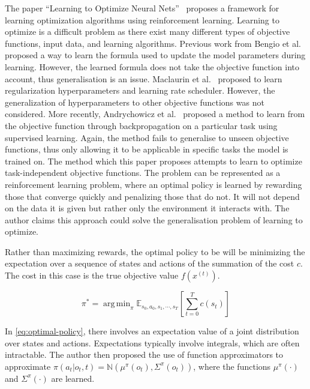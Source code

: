 \documentclass{article}
\DeclareMathOperator*{\argmin}{arg\,min}
\begin{document}
The paper ``Learning to Optimize Neural Nets''~\cite{liLearningOptimizeNeural2017} proposes a framework for learning optimization algorithms using reinforcement learning. Learning to optimize is a difficult problem as there exist many different types of objective functions, input data, and learning algorithms. Previous work from Bengio et al.~\cite{LearningSynapticLearning} proposed a way to learn the formula used to update the model parameters during learning. However, the learned formula does not take the objective function into account, thus generalisation is an issue. Maclaurin et al.~\cite{maclaurinGradientbasedHyperparameterOptimization2015} proposed to learn regularization hyperparameters and learning rate scheduler. However, the generalization of hyperparameters to other objective functions was not considered. More recently, Andrychowicz et al.~\cite{andrychowiczLearningLearnGradient2016} proposed a method to learn from the objective function through backpropagation on a particular task using supervised learning. Again, the method fails to generalise to unseen objective functions, thus only allowing it to be applicable in specific tasks the model is trained on. The method which this paper proposes attempts to learn to optimize task-independent objective functions. The problem can be represented as a reinforcement learning problem, where an optimal policy is learned by rewarding those that converge quickly and penalizing those that do not. It will not depend on the data it is given but rather only the environment it interacts with. The author claims this approach could solve the generalisation problem of learning to optimize.

Rather than maximizing rewards, the optimal policy to be will be minimizing the expectation over a sequence of states and actions of the summation of the cost $c$. The cost in this case is the true objective value $f(x^{(t)})$. 

\begin{equation}
    \pi^{*} = \argmin_{\pi} \mathbb{E}_{s_0, a_0, s_1, \cdots, s_T} [\sum_{t=0}^{T} c(s_t)]
    \label{eq:optimal-policy}
\end{equation}

In \cref{eq:optimal-policy}, there involves an expectation value of a joint distribution over states and actions. Expectations typically involve integrals, which are often intractable. The author then proposed the use of function approximators to approximate 
$\pi (a_t | o_t, t) = \mathbb{N} (\mu^{\pi} (o_t), \Sigma^{\pi} (o_t))$, where the functions $\mu^{\pi}(\cdot)$ and $\Sigma^{\pi} (\cdot)$ are learned.
\end{document}
